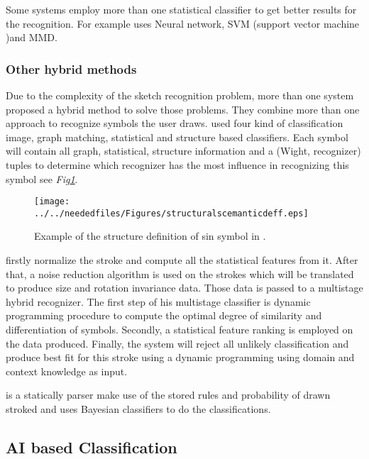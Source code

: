 Some systems employ more than one statistical classifier to get better results for the recognition. For example \cite{zernike61} uses Neural network, SVM (support vector machine )and MMD. \cite{polygonfeedback31}

\subsubsection{Other hybrid methods}
\label{sec:Other hybrid methods}

Due to the complexity of the sketch recognition problem, more than one system proposed a hybrid method to solve those problems. They combine more than one approach to recognize symbols the user draws.
\cite{sketchunderstanding1,Simusketch51}  used four kind of classification image, graph matching, statistical and structure based classifiers. Each symbol will contain all graph, statistical, structure information and a (Wight, recognizer) tuples to determine which recognizer has the most influence in recognizing this symbol see \textit{Fig\ref{fig:structuralscemanticdeff}}.
\begin{figure}
	\centering
		\texttt{[image: ../../neededfiles/Figures/structuralscemanticdeff.eps]}
	\caption[Structure definitions]{Example of the structure definition of sin symbol in \cite{sketchunderstanding1}.}
	\label{fig:structuralscemanticdeff}
\end{figure}

\cite {HMM53}  firstly normalize the stroke and compute all the statistical features from it. After that, a noise reduction algorithm is used on the strokes which will be translated to produce size and rotation invariance data. Those data is passed to a multistage hybrid recognizer. The first step of his multistage classifier is dynamic programming procedure to compute the optimal degree of similarity and differentiation of symbols. Secondly, a statistical feature ranking is employed on the data produced. Finally, the system will reject all unlikely classification and produce best fit for this stroke using a dynamic programming using domain and context knowledge as input.

\cite{statisticalparsing26} is a statically parser make use of the stored rules and probability of drawn stroked and uses Bayesian classifiers to do the classifications.


\subsection{AI based Classification}
\label{sec:AI based Classification}

